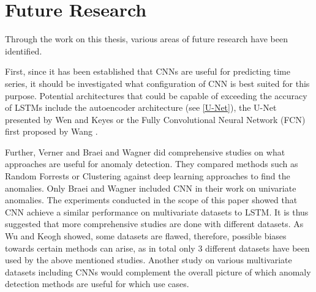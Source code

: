 \section{Future Research}
Through the work on this thesis, various areas of future research have been identified.

First, since it has been established that CNNs are useful for predicting time series, it should be investigated what configuration of CNN is best suited for this purpose. Potential architectures that could be capable of exceeding the accuracy of LSTMs include the autoencoder architecture (see \ref{U-Net}), the U-Net presented by Wen and Keyes \parencite*{Wen2019} or the Fully Convolutional Neural Network (FCN) first proposed by Wang \parencite*{Wang2017}.

Further, Verner \parencite*{Verner2019} and Braei and Wagner \parencite*{Braei2020} did comprehensive studies on what approaches are useful for anomaly detection. They compared methods such as Random Forrests or Clustering against deep learning approaches to find the anomalies. Only Braei and Wagner \parencite*{Braei2020} included CNN in their work on univariate anomalies. The experiments conducted in the scope of this paper showed that CNN achieve a similar performance on multivariate datasets to LSTM. It is thus suggested that more comprehensive studies are done with different datasets. As Wu and Keogh \parencite*{Wu2020} showed, some datasets are flawed, therefore, possible biases towards certain methods can arise, as in total only 3 different datasets have been used by the above mentioned studies. Another study on various multivariate datasets including CNNs would complement the overall picture of which anomaly detection methods are useful for which use cases.







